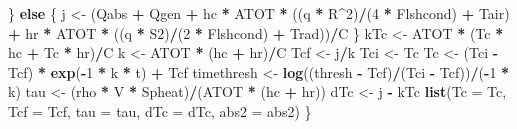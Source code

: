 \documentclass[]{article}
\newenvironment{Shaded}{\begin{snugshade}}{\end{snugshade}}
\newcommand{\KeywordTok}[1]{\textcolor[rgb]{0.13,0.29,0.53}{\textbf{#1}}}
\newcommand{\DataTypeTok}[1]{\textcolor[rgb]{0.13,0.29,0.53}{#1}}
\newcommand{\DecValTok}[1]{\textcolor[rgb]{0.00,0.00,0.81}{#1}}
\newcommand{\StringTok}[1]{\textcolor[rgb]{0.31,0.60,0.02}{#1}}
\newcommand{\ControlFlowTok}[1]{\textcolor[rgb]{0.13,0.29,0.53}{\textbf{#1}}}
\newcommand{\OperatorTok}[1]{\textcolor[rgb]{0.81,0.36,0.00}{\textbf{#1}}}
\newcommand{\NormalTok}[1]{#1}
\begin{document}
\begin{Shaded}
\begin{Highlighting}[]
\NormalTok{    \}}
    \ControlFlowTok{else}\NormalTok{ \{}
\NormalTok{        j <-}\StringTok{ }\NormalTok{(Qabs }\OperatorTok{+}\StringTok{ }\NormalTok{Qgen }\OperatorTok{+}\StringTok{ }\NormalTok{hc }\OperatorTok{*}\StringTok{ }\NormalTok{ATOT }\OperatorTok{*}\StringTok{ }\NormalTok{((q }\OperatorTok{*}\StringTok{ }\NormalTok{R}\OperatorTok{^}\DecValTok{2}\NormalTok{)}\OperatorTok{/}\NormalTok{(}\DecValTok{4} \OperatorTok{*}\StringTok{ }\NormalTok{Flshcond) }\OperatorTok{+}\StringTok{ }
\StringTok{            }\NormalTok{Tair) }\OperatorTok{+}\StringTok{ }\NormalTok{hr }\OperatorTok{*}\StringTok{ }\NormalTok{ATOT }\OperatorTok{*}\StringTok{ }\NormalTok{((q }\OperatorTok{*}\StringTok{ }\NormalTok{S2)}\OperatorTok{/}\NormalTok{(}\DecValTok{2} \OperatorTok{*}\StringTok{ }\NormalTok{Flshcond) }\OperatorTok{+}\StringTok{ }\NormalTok{Trad))}\OperatorTok{/}\NormalTok{C}
\NormalTok{    \}}
\NormalTok{    kTc <-}\StringTok{ }\NormalTok{ATOT }\OperatorTok{*}\StringTok{ }\NormalTok{(Tc }\OperatorTok{*}\StringTok{ }\NormalTok{hc }\OperatorTok{+}\StringTok{ }\NormalTok{Tc }\OperatorTok{*}\StringTok{ }\NormalTok{hr)}\OperatorTok{/}\NormalTok{C}
\NormalTok{    k <-}\StringTok{ }\NormalTok{ATOT }\OperatorTok{*}\StringTok{ }\NormalTok{(hc }\OperatorTok{+}\StringTok{ }\NormalTok{hr)}\OperatorTok{/}\NormalTok{C}
\NormalTok{    Tcf <-}\StringTok{ }\NormalTok{j}\OperatorTok{/}\NormalTok{k}
\NormalTok{    Tci <-}\StringTok{ }\NormalTok{Tc}
\NormalTok{    Tc <-}\StringTok{ }\NormalTok{(Tci }\OperatorTok{-}\StringTok{ }\NormalTok{Tcf) }\OperatorTok{*}\StringTok{ }\KeywordTok{exp}\NormalTok{(}\OperatorTok{-}\DecValTok{1} \OperatorTok{*}\StringTok{ }\NormalTok{k }\OperatorTok{*}\StringTok{ }\NormalTok{t) }\OperatorTok{+}\StringTok{ }\NormalTok{Tcf}
\NormalTok{    timethresh <-}\StringTok{ }\KeywordTok{log}\NormalTok{((thresh }\OperatorTok{-}\StringTok{ }\NormalTok{Tcf)}\OperatorTok{/}\NormalTok{(Tci }\OperatorTok{-}\StringTok{ }\NormalTok{Tcf))}\OperatorTok{/}\NormalTok{(}\OperatorTok{-}\DecValTok{1} \OperatorTok{*}\StringTok{ }\NormalTok{k)}
\NormalTok{    tau <-}\StringTok{ }\NormalTok{(rho }\OperatorTok{*}\StringTok{ }\NormalTok{V }\OperatorTok{*}\StringTok{ }\NormalTok{Spheat)}\OperatorTok{/}\NormalTok{(ATOT }\OperatorTok{*}\StringTok{ }\NormalTok{(hc }\OperatorTok{+}\StringTok{ }\NormalTok{hr))}
\NormalTok{    dTc <-}\StringTok{ }\NormalTok{j }\OperatorTok{-}\StringTok{ }\NormalTok{kTc}
    \KeywordTok{list}\NormalTok{(}\DataTypeTok{Tc =}\NormalTok{ Tc, }\DataTypeTok{Tcf =}\NormalTok{ Tcf, }\DataTypeTok{tau =}\NormalTok{ tau, }\DataTypeTok{dTc =}\NormalTok{ dTc, }\DataTypeTok{abs2 =}\NormalTok{ abs2)}
\NormalTok{\}}
\end{Highlighting}
\end{Shaded}
\end{document}
